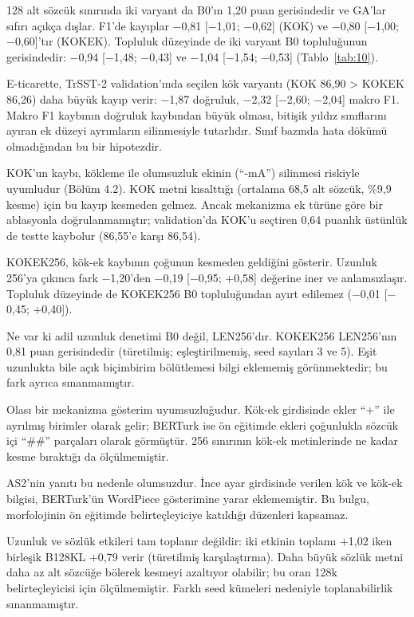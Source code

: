 \documentclass[11pt]{article}
\begin{document}
128 alt sözcük sınırında iki varyant da B0'ın 1,20 puan gerisindedir ve GA'lar sıfırı açıkça dışlar. F1'de kayıplar $-$0,81 [$-$1,01; $-$0,62] (KOK) ve $-$0,80 [$-$1,00; $-$0,60]'tır (KOKEK). Topluluk düzeyinde de iki varyant B0 topluluğunun gerisindedir: $-$0,94 [$-$1,48; $-$0,43] ve $-$1,04 [$-$1,54; $-$0,53] (Tablo~\ref{tab:10}).

E-ticarette, TrSST-2 validation'ında seçilen kök varyantı (KOK 86,90 > KOKEK 86,26) daha büyük kayıp verir: $-$1,87 doğruluk, $-$2,32 [$-$2,60; $-$2,04] makro F1. Makro F1 kaybının doğruluk kaybından büyük olması, bitişik yıldız sınıflarını ayıran ek düzeyi ayrımların silinmesiyle tutarlıdır. Sınıf bazında hata dökümü olmadığından bu bir hipotezdir.

KOK'un kaybı, kökleme ile olumsuzluk ekinin (``-mA'') silinmesi riskiyle uyumludur (Bölüm 4.2). KOK metni kısalttığı (ortalama 68,5 alt sözcük, \%9,9 kesme) için bu kayıp kesmeden gelmez. Ancak mekanizma ek türüne göre bir ablasyonla doğrulanmamıştır; validation'da KOK'u seçtiren 0,64 puanlık üstünlük de testte kaybolur (86,55'e karşı 86,54).

KOKEK256, kök-ek kaybının çoğunun kesmeden geldiğini gösterir. Uzunluk 256'ya çıkınca fark $-$1,20'den $-$0,19 [$-$0,95; +0,58] değerine iner ve anlamsızlaşır. Topluluk düzeyinde de KOKEK256 B0 topluluğundan ayırt edilemez ($-$0,01 [$-$0,45; +0,40]).

Ne var ki adil uzunluk denetimi B0 değil, LEN256'dır. KOKEK256 LEN256'nın 0,81 puan gerisindedir (türetilmiş; eşleştirilmemiş, seed sayıları 3 ve 5). Eşit uzunlukta bile açık biçimbirim bölütlemesi bilgi eklememiş görünmektedir; bu fark ayrıca sınanmamıştır.

Olası bir mekanizma gösterim uyumsuzluğudur. Kök-ek girdisinde ekler ``+'' ile ayrılmış birimler olarak gelir; BERTurk ise ön eğitimde ekleri çoğunlukla sözcük içi ``\#\#'' parçaları olarak görmüştür. 256 sınırının kök-ek metinlerinde ne kadar kesme bıraktığı da ölçülmemiştir.

AS2'nin yanıtı bu nedenle olumsuzdur. İnce ayar girdisinde verilen kök ve kök-ek bilgisi, BERTurk'ün WordPiece gösterimine yarar eklememiştir. Bu bulgu, morfolojinin ön eğitimde belirteçleyiciye katıldığı düzenleri \citep{toraman2023} kapsamaz.

Uzunluk ve sözlük etkileri tam toplanır değildir: iki etkinin toplamı +1,02 iken birleşik B128KL +0,79 verir (türetilmiş karşılaştırma). Daha büyük sözlük metni daha az alt sözcüğe bölerek kesmeyi azaltıyor olabilir; bu oran 128k belirteçleyicisi için ölçülmemiştir. Farklı seed kümeleri nedeniyle toplanabilirlik sınanmamıştır.
\end{document}
